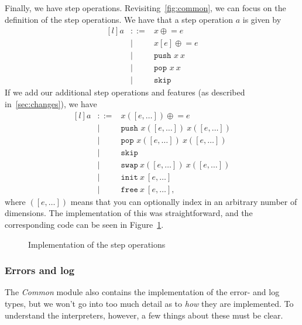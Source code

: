 Finally, we have step operations. Revisiting~\ref{fig:common}, we can focus on the definition of the step operations. We have that a step operation $a$ is given by
\[
\begin{matrix*}[l]
  {a} & ::= & {x}\mathrel{\oplus}= e \\
             &  |  & {x}[ e]\mathrel{\oplus}= e \\
             &  |  & \texttt{push }{x}\ {x} \\
             &  |  & \texttt{pop  }{x}\ {x} \\
             &  |  & \texttt{skip}
\end{matrix*}
\]
If we add our additional step operations and features (as described in~\ref{sec:changes}), we have
\[
\begin{matrix*}[l]
  {a} & ::= & {x}([ e,\dots])\mathrel{\oplus}= e \\
      &  |  & \texttt{push }{x}([e,\dots])\ {x}([e,\dots]) \\
      &  |  & \texttt{pop  }{x}([e,\dots])\ {x}([e,\dots]) \\
      &  |  & \texttt{skip} \\
      &  |  & \texttt{swap} \ x([e,\dots]) \ x([e,\dots]) \\
      &  |  & \texttt{init} \ x \ [e,\dots] \\
      &  |  & \texttt{free} \ x \ [e,\dots],
\end{matrix*}
\]
where $([e,\dots])$ means that you can optionally index in an arbitrary number of dimensions. The implementation of this was straightforward, and the corresponding code can be seen in Figure~\ref{fig:step}.

\begin{figure}[H]
  
  \caption{Implementation of the step operations}\label{fig:step}
\end{figure}

\subsubsection{Errors and log}
The \textit{Common} module also contains the implementation of the error- and log types, but we won't go into too much detail as to \textit{how} they are implemented. To understand the interpreters, however, a few things about these must be clear.


